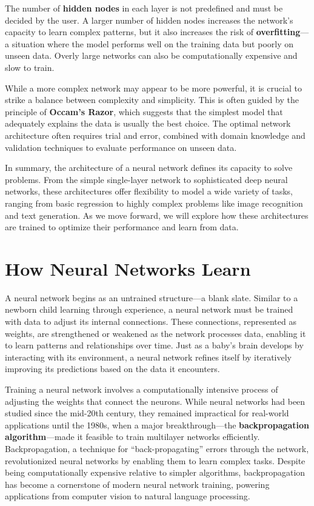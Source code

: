 \documentclass[
]{book}
\theoremstyle{definition}
\theoremstyle{definition}
\theoremstyle{definition}
\theoremstyle{definition}
\theoremstyle{remark}
\begin{document}
The number of \textbf{hidden nodes} in each layer is not predefined and must be decided by the user. A larger number of hidden nodes increases the network's capacity to learn complex patterns, but it also increases the risk of \textbf{overfitting}---a situation where the model performs well on the training data but poorly on unseen data. Overly large networks can also be computationally expensive and slow to train.

While a more complex network may appear to be more powerful, it is crucial to strike a balance between complexity and simplicity. This is often guided by the principle of \textbf{Occam's Razor}, which suggests that the simplest model that adequately explains the data is usually the best choice. The optimal network architecture often requires trial and error, combined with domain knowledge and validation techniques to evaluate performance on unseen data.

In summary, the architecture of a neural network defines its capacity to solve problems. From the simple single-layer network to sophisticated deep neural networks, these architectures offer flexibility to model a wide variety of tasks, ranging from basic regression to highly complex problems like image recognition and text generation. As we move forward, we will explore how these architectures are trained to optimize their performance and learn from data.

\section{How Neural Networks Learn}\label{how-neural-networks-learn}

A neural network begins as an untrained structure---a blank slate. Similar to a newborn child learning through experience, a neural network must be trained with data to adjust its internal connections. These connections, represented as weights, are strengthened or weakened as the network processes data, enabling it to learn patterns and relationships over time. Just as a baby's brain develops by interacting with its environment, a neural network refines itself by iteratively improving its predictions based on the data it encounters.

Training a neural network involves a computationally intensive process of adjusting the weights that connect the neurons. While neural networks had been studied since the mid-20th century, they remained impractical for real-world applications until the 1980s, when a major breakthrough---the \textbf{backpropagation algorithm}---made it feasible to train multilayer networks efficiently. Backpropagation, a technique for ``back-propagating'' errors through the network, revolutionized neural networks by enabling them to learn complex tasks. Despite being computationally expensive relative to simpler algorithms, backpropagation has become a cornerstone of modern neural network training, powering applications from computer vision to natural language processing.
\end{document}

